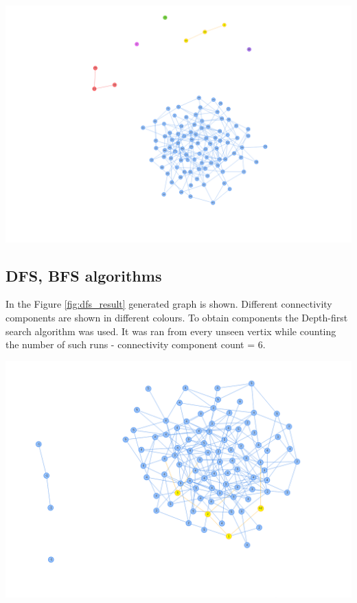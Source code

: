 \begin{center}
    \includegraphics[width=\linewidth]{../results/grapht.png}
    \label{fig:dfs_result}
\end{center}

\subsection*{DFS, BFS algorithms}

In the Figure \ref{fig:dfs_result} generated graph is shown. Different connectivity components are shown in different colours. To obtain components the Depth-first search algorithm was used.
It was ran from every unseen vertix while counting the number of such runs - connectivity component count = 6.

\begin{center}
    \includegraphics[width=\linewidth]{../results/bfs_result.png}
    \label{fig:bfs_result}
\end{center}


